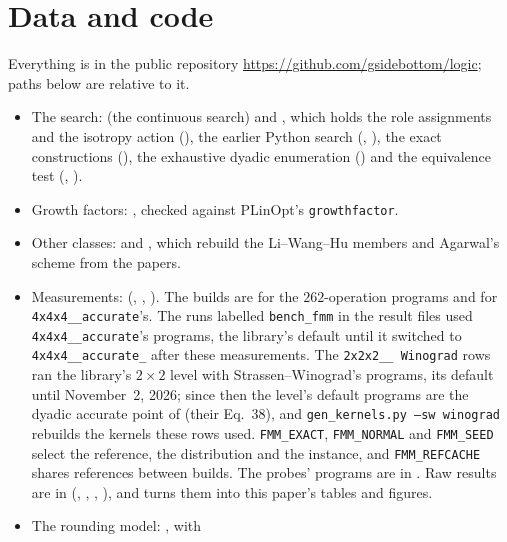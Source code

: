 \documentclass[11pt]{article}
\theoremstyle{remark}
\newcommand{\acc}{\texttt{4x4x4\_\allowbreak 48\_\allowbreak accurate}\xspace}
\newcommand{\acct}{\texttt{4x4x4\_\allowbreak 48\_\allowbreak accurate\_\allowbreak 262}\xspace}
\begin{document}
\section{Data and code}\label{sec:data}

Everything is in the public repository
\url{https://github.com/gsidebottom/logic}; paths below are relative to
it.
\begin{itemize}
\item The search:  (the continuous search) and
  , which holds the role assignments and the
  isotropy action (), the earlier Python search
  (, ), the exact constructions
  (), the exhaustive dyadic enumeration
  () and the equivalence test (,
  ).
\item Growth factors: , checked against
  PLinOpt's \texttt{growthfactor}.
\item Other classes:  and
  , which rebuild the Li--Wang--Hu members and
  Agarwal's scheme from the papers.
\item Measurements:  (,
  , ).  The builds are
   for the $262$-operation programs and
   for \acc's.  The runs labelled
  \texttt{bench\_fmm} in the result files used \acc's programs, the
  library's default until it switched to \acct
  after these measurements.  The \texttt{2x2x2\_\_\allowbreak
  Winograd} rows ran the library's $2\times2$ level with Strassen--Winograd's
  programs, its default until November~2, 2026; since then the level's
  default programs are the dyadic accurate point of \cite{DPS24} (their
  Eq.~38), and \texttt{gen\_kernels.py --sw winograd} rebuilds the kernels
  these rows used.  \texttt{FMM\_EXACT}, \texttt{FMM\_NORMAL}
  and \texttt{FMM\_SEED} select the reference, the distribution and the
  instance, and \texttt{FMM\_REFCACHE} shares references between
  builds.  The probes' programs are in .
  Raw results are in 
  (,
  , ,
  ), and
   turns them into this paper's
  tables and figures.
\item The rounding model: , with

\end{itemize}
\end{document}
